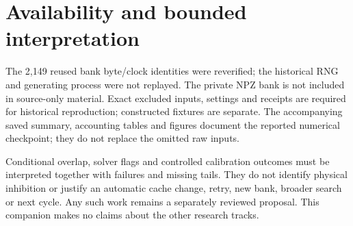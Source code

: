 \documentclass[11pt]{article}
\begin{document}


\section*{Availability and bounded interpretation}
The 2,149 reused bank byte/clock identities were reverified; the historical
RNG and generating process were not replayed. The private NPZ bank is not
included in source-only material. Exact excluded inputs, settings and receipts
are required for historical reproduction; constructed fixtures are separate.
The accompanying saved summary, accounting tables and figures document the
reported numerical checkpoint; they do not replace the omitted raw inputs.

Conditional overlap, solver flags and controlled calibration outcomes must be
interpreted together with failures and missing tails. They do not identify
physical inhibition or justify an automatic cache change, retry, new bank,
broader search or next cycle. Any such work remains a separately reviewed
proposal. This companion makes no claims about the other research tracks.
\end{document}
